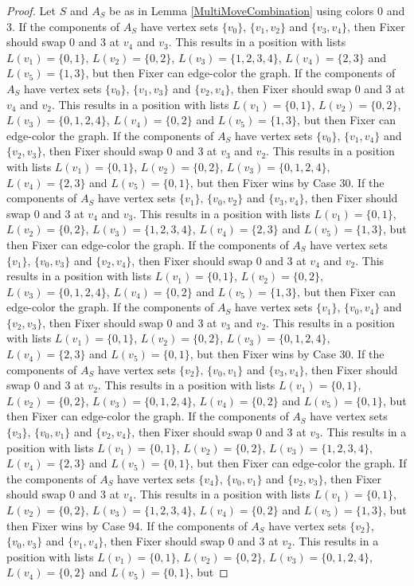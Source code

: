 \documentclass[12pt]{amsart}
\theoremstyle{plain}
\theoremstyle{definition}
\theoremstyle{remark}
\begin{document}
\begin{proof}
Let $S$ and $A_S$ be as in Lemma \ref{MultiMoveCombination} using colors $0$ and $3$. If the components of $A_S$ have vertex sets $\{v_0\}$, $\{v_1, v_2\}$ and $\{v_3, v_4\}$, then Fixer should swap 0 and 3 at $v_4$ and $v_3$. This results in a position with lists $L(v_1) = \{0, 1\}$, $L(v_2) = \{0, 2\}$, $L(v_3) = \{1, 2, 3, 4\}$, $L(v_4) = \{2, 3\}$ and $L(v_5) = \{1, 3\}$, but then Fixer can edge-color the graph. If the components of $A_S$ have vertex sets $\{v_0\}$, $\{v_1, v_3\}$ and $\{v_2, v_4\}$, then Fixer should swap 0 and 3 at $v_4$ and $v_2$. This results in a position with lists $L(v_1) = \{0, 1\}$, $L(v_2) = \{0, 2\}$, $L(v_3) = \{0, 1, 2, 4\}$, $L(v_4) = \{0, 2\}$ and $L(v_5) = \{1, 3\}$, but then Fixer can edge-color the graph. If the components of $A_S$ have vertex sets $\{v_0\}$, $\{v_1, v_4\}$ and $\{v_2, v_3\}$, then Fixer should swap 0 and 3 at $v_3$ and $v_2$. This results in a position with lists $L(v_1) = \{0, 1\}$, $L(v_2) = \{0, 2\}$, $L(v_3) = \{0, 1, 2, 4\}$, $L(v_4) = \{2, 3\}$ and $L(v_5) = \{0, 1\}$, but then Fixer wins by Case 30. If the components of $A_S$ have vertex sets $\{v_1\}$, $\{v_0, v_2\}$ and $\{v_3, v_4\}$, then Fixer should swap 0 and 3 at $v_4$ and $v_3$. This results in a position with lists $L(v_1) = \{0, 1\}$, $L(v_2) = \{0, 2\}$, $L(v_3) = \{1, 2, 3, 4\}$, $L(v_4) = \{2, 3\}$ and $L(v_5) = \{1, 3\}$, but then Fixer can edge-color the graph. If the components of $A_S$ have vertex sets $\{v_1\}$, $\{v_0, v_3\}$ and $\{v_2, v_4\}$, then Fixer should swap 0 and 3 at $v_4$ and $v_2$. This results in a position with lists $L(v_1) = \{0, 1\}$, $L(v_2) = \{0, 2\}$, $L(v_3) = \{0, 1, 2, 4\}$, $L(v_4) = \{0, 2\}$ and $L(v_5) = \{1, 3\}$, but then Fixer can edge-color the graph. If the components of $A_S$ have vertex sets $\{v_1\}$, $\{v_0, v_4\}$ and $\{v_2, v_3\}$, then Fixer should swap 0 and 3 at $v_3$ and $v_2$. This results in a position with lists $L(v_1) = \{0, 1\}$, $L(v_2) = \{0, 2\}$, $L(v_3) = \{0, 1, 2, 4\}$, $L(v_4) = \{2, 3\}$ and $L(v_5) = \{0, 1\}$, but then Fixer wins by Case 30. If the components of $A_S$ have vertex sets $\{v_2\}$, $\{v_0, v_1\}$ and $\{v_3, v_4\}$, then Fixer should swap 0 and 3 at $v_2$. This results in a position with lists $L(v_1) = \{0, 1\}$, $L(v_2) = \{0, 2\}$, $L(v_3) = \{0, 1, 2, 4\}$, $L(v_4) = \{0, 2\}$ and $L(v_5) = \{0, 1\}$, but then Fixer can edge-color the graph. If the components of $A_S$ have vertex sets $\{v_3\}$, $\{v_0, v_1\}$ and $\{v_2, v_4\}$, then Fixer should swap 0 and 3 at $v_3$. This results in a position with lists $L(v_1) = \{0, 1\}$, $L(v_2) = \{0, 2\}$, $L(v_3) = \{1, 2, 3, 4\}$, $L(v_4) = \{2, 3\}$ and $L(v_5) = \{0, 1\}$, but then Fixer can edge-color the graph. If the components of $A_S$ have vertex sets $\{v_4\}$, $\{v_0, v_1\}$ and $\{v_2, v_3\}$, then Fixer should swap 0 and 3 at $v_4$. This results in a position with lists $L(v_1) = \{0, 1\}$, $L(v_2) = \{0, 2\}$, $L(v_3) = \{1, 2, 3, 4\}$, $L(v_4) = \{0, 2\}$ and $L(v_5) = \{1, 3\}$, but then Fixer wins by Case 94. If the components of $A_S$ have vertex sets $\{v_2\}$, $\{v_0, v_3\}$ and $\{v_1, v_4\}$, then Fixer should swap 0 and 3 at $v_2$. This results in a position with lists $L(v_1) = \{0, 1\}$, $L(v_2) = \{0, 2\}$, $L(v_3) = \{0, 1, 2, 4\}$, $L(v_4) = \{0, 2\}$ and $L(v_5) = \{0, 1\}$, but 
\end{proof}
\end{document}
